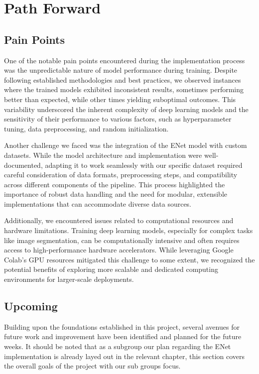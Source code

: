 \chapter{Path Forward}

\section{Pain Points}
One of the notable pain points encountered during the implementation process was the unpredictable nature of model performance during training. Despite following established methodologies and best practices, we observed instances where the trained models exhibited inconsistent results, sometimes performing better than expected, while other times yielding suboptimal outcomes. This variability underscored the inherent complexity of deep learning models and the sensitivity of their performance to various factors, such as hyperparameter tuning, data preprocessing, and random initialization.

Another challenge we faced was the integration of the ENet model with custom datasets. While the model architecture and implementation were well-documented, adapting it to work seamlessly with our specific dataset required careful consideration of data formats, preprocessing steps, and compatibility across different components of the pipeline. This process highlighted the importance of robust data handling and the need for modular, extensible implementations that can accommodate diverse data sources.

Additionally, we encountered issues related to computational resources and hardware limitations. Training deep learning models, especially for complex tasks like image segmentation, can be computationally intensive and often requires access to high-performance hardware accelerators. While leveraging Google Colab's GPU resources mitigated this challenge to some extent, we recognized the potential benefits of exploring more scalable and dedicated computing environments for larger-scale deployments.

\section{Upcoming}
Building upon the foundations established in this project, several avenues for future work and improvement have been identified and planned for the future weeks. It should be noted that as a subgroup our plan regarding the ENet implementation is already layed out in the relevant chapter, this section covers the overall goals of the project with our sub groups focus.
